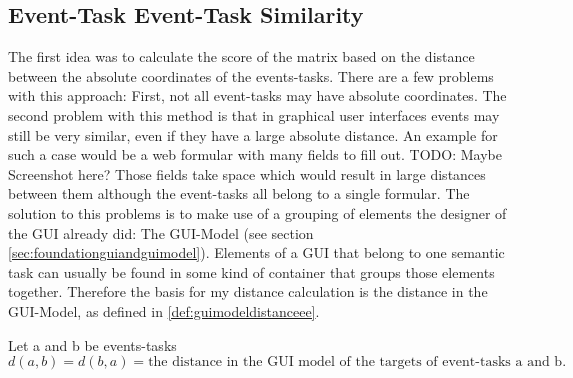 \subsection{Event-Task Event-Task Similarity}
The first idea was to calculate the score of the matrix based on the distance between the absolute coordinates of the events-tasks. 
There are a few problems with this approach: First, not all event-tasks may have absolute coordinates. 
The second problem with this method is that in graphical user interfaces events may still be very similar, even if they have a large absolute distance.
An example for such a case would be a web formular with many fields to fill out. 
TODO: Maybe Screenshot here?
Those fields take space which would result in large distances between them although the event-tasks all belong to a single formular.
The solution to this problems is to make use of a grouping of elements the designer of the GUI already did: The GUI-Model (see section \ref{sec:foundationguiandguimodel}).
Elements of a GUI that belong to one semantic task can usually be found in some kind of container that groups those elements together. Therefore the basis for my 
distance calculation is the distance in the GUI-Model, as defined in \ref{def:guimodeldistanceee}. 

\begin{definition}
	\item Let a and b be events-tasks
\begin{equation*}d(a,b) = d(b,a) = \text{the distance in the GUI model of the targets of event-tasks a and b.}
\end{equation*}
\label{def:guimodeldistanceee}
\end{definition}

